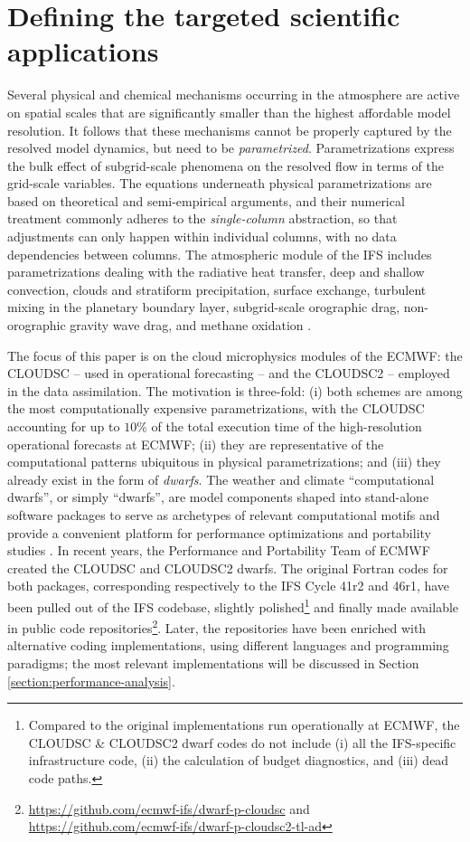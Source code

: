 \documentclass[gmd,manuscript,online]{copernicus}
\begin{document}
	\section{Defining the targeted scientific applications}
	\label{section:target-cloud-microphysics-schemes}

	Several physical and chemical mechanisms occurring in the atmosphere are active on spatial scales that are significantly smaller than the highest affordable model resolution. It follows that these mechanisms cannot be properly captured by the resolved model dynamics, but need to be \emph{parametrized}. Parametrizations express the bulk effect of subgrid-scale phenomena on the resolved flow in terms of the grid-scale variables. The equations underneath physical parametrizations are based on theoretical and semi-empirical arguments, and their numerical treatment commonly adheres to the \emph{single-column} abstraction, so that adjustments can only happen within individual columns, with no data dependencies between columns. The atmospheric module of the IFS includes parametrizations dealing with the radiative heat transfer, deep and shallow convection, clouds and stratiform precipitation, surface exchange, turbulent mixing in the planetary boundary layer, subgrid-scale orographic drag, non-orographic gravity wave drag, and methane oxidation \citep{ifs48r1}.

	The focus of this paper is on the cloud microphysics modules of the ECMWF: the CLOUDSC -- used in operational forecasting -- and the CLOUDSC2 -- employed in the data assimilation. The motivation is three-fold: (i) both schemes are among the most computationally expensive parametrizations, with the CLOUDSC accounting for up to $10\%$ of the total execution time of the high-resolution operational forecasts at ECMWF; (ii) they are representative of the computational patterns ubiquitous in physical parametrizations; and (iii) they already exist in the form of \emph{dwarfs}. The weather and climate ``computational dwarfs'', or simply ``dwarfs'', are model components shaped into stand-alone software packages to serve as archetypes of relevant computational motifs \citep{muller19} and provide a convenient platform for performance optimizations and portability studies \citep{bauer20}. In recent years, the Performance and Portability Team of ECMWF created the CLOUDSC and CLOUDSC2 dwarfs. The original Fortran codes for both packages, corresponding respectively to the IFS Cycle 41r2 and 46r1, have been pulled out of the IFS codebase, slightly polished\footnote{Compared to the original implementations run operationally at ECMWF, the CLOUDSC \& CLOUDSC2 dwarf codes do not include (i) all the IFS-specific infrastructure code, (ii) the calculation of budget diagnostics, and (iii) dead code paths.} and finally made available in public code repositories\footnote{\url{https://github.com/ecmwf-ifs/dwarf-p-cloudsc} and \url{https://github.com/ecmwf-ifs/dwarf-p-cloudsc2-tl-ad}}. Later, the repositories have been enriched with alternative coding implementations, using different languages and programming paradigms; the most relevant implementations will be discussed in Section \ref{section:performance-analysis}.
\end{document}
